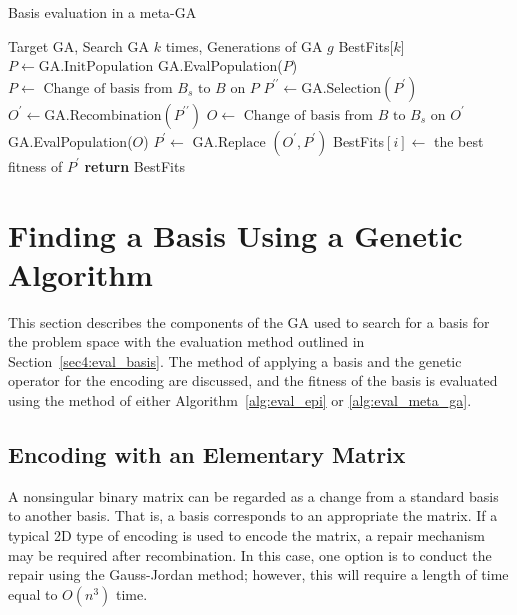 \begin{algorithm}[H]
	\caption{Basis evaluation in a meta-GA}\label{alg:eval_meta_ga}
	\begin{algorithmic}[1]
		\Require Target GA, Search GA $ k $ times, Generations of GA $ g $
		 
		\State BestFits[$k$] 
		\State $ P \gets \text{GA.InitPopulation} $ 
		\State GA.EvalPopulation($P$) 
		\State $ P \gets \text{ Change of basis from } B_s \text{ to } B \text{ on } P $
		\State $ P^{\prime\prime} \gets \text{GA.Selection}(P^\prime) $
		\State $ O^\prime \gets \text{GA.Recombination}(P^{\prime\prime}) $ 
		\State $ O \gets \text{ Change of basis from } B \text{ to } B_s \text{ on } O^\prime $
		\State GA.EvalPopulation($O$)
		\State $ P^\prime \gets \text{ GA.Replace }(O^\prime, P^\prime) $
		\EndFor
		\State BestFits$[i] \gets $ the best fitness of $ P^\prime $
		\EndFor
		\State \textbf{return} BestFits
		\EndProcedure
	\end{algorithmic}
\end{algorithm}

\section{Finding a Basis Using a Genetic Algorithm} \label{sec5:find_basis_GA}
This section describes the components of the GA used to search for a basis for the problem space with the evaluation method outlined in Section~\ref{sec4:eval_basis}. The method of applying a basis and the genetic operator for the encoding are discussed, and the fitness of the basis is evaluated using the method of either Algorithm~\ref{alg:eval_epi} or \ref{alg:eval_meta_ga}.

\subsection{Encoding with an Elementary Matrix}
A nonsingular binary matrix can be regarded as a change from a standard basis to another basis. That is, a basis corresponds to an appropriate the matrix. If a typical 2D type of encoding is used to encode the matrix, a repair mechanism may be required after recombination. In this case, one option is to conduct the repair using the Gauss-Jordan method; however, this will require a length of time equal to $ O\left(n^3\right) $ time.

